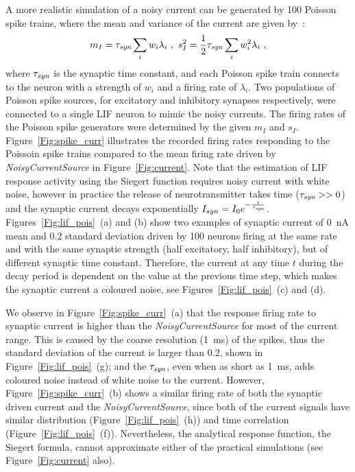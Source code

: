 	A more realistic simulation of a noisy current can be generated by 100 Poisson spike trains, 
	where the mean and variance of the current are given by~\citep{la2008response}:
	\begin{equation}
	m_I = \tau_{\textit{\textrm{syn}}}\sum_i w_i\lambda_{i}~, ~s_I^2=\frac{1}{2}\tau_{\textit{\textrm{syn}}}\sum_i w_i^2\lambda_{i}~,
	\label{equ:distr0}
	\end{equation}
	where $\tau_{\textit{\textrm{syn}}}$ is the synaptic time constant, and each Poisson spike train connects to the neuron with a strength of $w_i$ and a firing rate of $\lambda_i$.
	Two populations of Poisson spike sources, for excitatory and inhibitory synapses respectively, were connected to a single LIF neuron to mimic the noisy currents.
	The firing rates of the Poisson spike generators were determined by the given $m_I$ and $s_I$.
	Figure~\ref{Fig:spike_curr} illustrates the recorded firing rates responding to the Poissoin spike trains compared to the mean firing rate driven by \textit{NoisyCurrentSource} in Figure~\ref{Fig:current}.
	Note that the estimation of LIF response activity using the Siegert function requires noisy current with white noise, however
	in practice the release of neurotransmitter takes time ($\tau_{\textit{\textrm{syn}}} >> 0$) and the synaptic current decays exponentially $I_{syn} = I_0 e^{-\frac{t}{\tau_{\textit{\textrm{syn}}}}}$.
	Figures~\ref{Fig:lif_pois}~(a) and (b) show two examples of synaptic current of 0~nA mean and 0.2 standard deviation driven by 100 neurons firing at the same rate and with the same synaptic strength (half excitatory, half inhibitory), but of different synaptic time constant.
	Therefore, the current at any time $t$ during the decay period is dependent on the value at the previous time step, which makes the synaptic current a coloured noise, see Figures~\ref{Fig:lif_pois}~(c) and (d).
	
	We observe in Figure~\ref{Fig:spike_curr}~(a) that the response firing rate to synaptic current is higher than the \textit{NoisyCurrentSource} for most of the current range.
	This is caused by the coarse resolution (1~ms) of the spikes, thus the standard deviation of the current is larger than 0.2, shown in Figure~\ref{Fig:lif_pois}~(g);
	and the $\tau_{\textit{\textrm{syn}}}$, even when as short as 1~ms, adds coloured noise instead of white noise to the current.
	However, Figure~\ref{Fig:spike_curr}~(b) shows a similar firing rate of both the synaptic driven current and the \textit{NoisyCurrentSource}, since both of the current signals have similar distribution (Figure~\ref{Fig:lif_pois}~(h)) and time correlation (Figure~\ref{Fig:lif_pois}~(f)).
	Nevertheless, the analytical response function, the Siegert formula, cannot approximate either of the practical simulations (see Figure~\ref{Fig:current} also).

